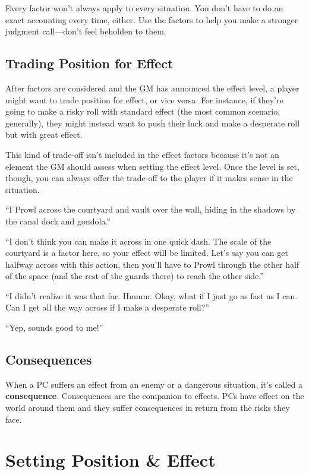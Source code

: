 Every factor won’t always apply to every situation. You don’t have to do an exact accounting every time, either. Use the factors to help you make a stronger judgment call---don’t feel beholden to them.

\subsection{Trading Position for Effect}

After factors are considered and the GM has announced the effect level, a player might want to trade position for effect, or vice versa. For instance, if they’re going to make a risky roll with standard effect (the most common scenario, generally), they might instead want to push their luck and make a desperate roll but with great effect.

This kind of trade-off isn’t included in the effect factors because it’s not an element the GM should assess when setting the effect level. Once the level is set, though, you can always offer the trade-off to the player if it makes sense in the situation.

\begin{qb}``I Prowl across the courtyard and vault over the wall, hiding in the shadows by the canal dock and gondola.''

``I don’t think you can make it across in one quick dash. The scale of the courtyard is a factor here, so your effect will be limited. Let’s say you can get halfway across with this action, then you’ll have to Prowl through the other half of the space (and the rest of the guards there) to reach the other side.''


``I didn’t realize it was that far. Hmmm. Okay, what if I just go as fast as I can. Can I get all the way across if I make a desperate roll?''


``Yep, sounds good to me!''\end{qb}

\subsection{Consequences}

When a PC suffers an effect from an enemy or a dangerous situation, it’s called a \textbf{consequence}. Consequences are the companion to effects. PCs have effect on the world around them and they suffer consequences in return from the risks they face.

\section{Setting Position \& Effect}


